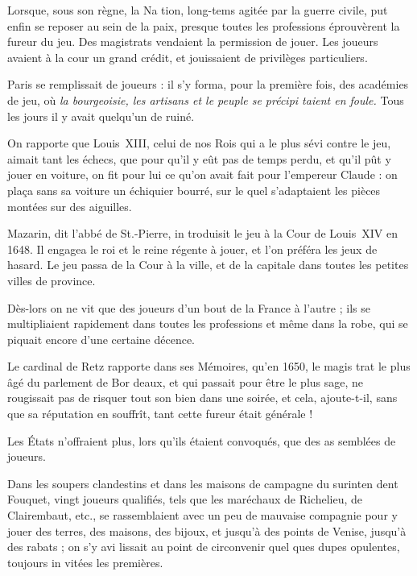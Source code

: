 Lorsque, sous son règne, la Na%
tion, long-tems agitée par la guerre
civile, put enfin se reposer au sein de
la paix, presque toutes les professions
éprouvèrent la fureur du jeu. Des
magistrats vendaient la permission
de jouer. Les joueurs avaient à la
cour un grand crédit, et jouissaient
de privilèges particuliers.

Paris se remplissait de joueurs : il
s'y forma, pour la première fois, des
académies de jeu, où \emph{la bourgeoisie,
les artisans et le peuple se précipi%
taient en foule.} Tous les jours il y
avait quelqu'un de ruiné.

On rapporte que Louis~XIII, celui
de nos Rois qui a le plus sévi contre
le jeu, aimait tant les échecs, que
pour qu'il y eût pas de temps perdu,
et qu'il pût y jouer en voiture, on
fit pour lui ce qu'on avait fait pour
l'empereur Claude : on plaça sans sa
voiture un échiquier bourré, sur le%
quel s'adaptaient les pièces montées
sur des aiguilles.

Mazarin, dit l'abbé de St.-Pierre, in%
troduisit le jeu à la Cour de Louis~XIV
en 1648. Il engagea le roi et le reine
régente à jouer, et l'on préféra les jeux
de hasard. Le jeu passa de la Cour à la
ville, et de la capitale dans toutes les
petites villes de province.

Dès-lors on ne vit que des joueurs
d'un bout de la France à l'autre ; ils se
multipliaient rapidement dans toutes
les professions et même dans la robe,
qui se piquait encore d'une certaine
décence.

Le cardinal de Retz rapporte dans
ses Mémoires, qu'en 1650, le magis%
trat le plus âgé du parlement de Bor%
deaux, et qui passait pour être le plus
sage, ne rougissait pas de risquer tout
son bien dans une soirée, et cela,
ajoute-t-il, sans que sa réputation
en souffrît, tant cette fureur était
générale !

Les États n'offraient plus, lors%
qu'ils étaient convoqués, que des as%
semblées de joueurs.


Dans les soupers clandestins et dans
les maisons de campagne du surinten%
dent Fouquet, vingt joueurs qualifiés,
tels que les maréchaux de Richelieu,
de Clairembaut, etc., se rassemblaient
avec un peu de mauvaise compagnie
pour y jouer des terres, des maisons,
des bijoux, et jusqu'à des points de
Venise, jusqu'à des rabats ; on s'y avi%
lissait au point de circonvenir quel%
ques dupes opulentes, toujours in%
vitées les premières.

